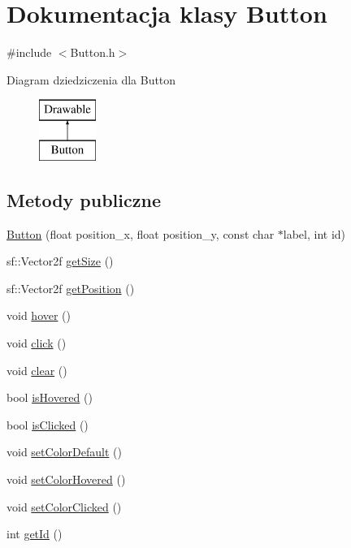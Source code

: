 \hypertarget{class_button}{}\section{Dokumentacja klasy Button}
\label{class_button}


{\ttfamily \#include $<$Button.\+h$>$}

Diagram dziedziczenia dla Button\begin{figure}[H]
\begin{center}
\leavevmode
\includegraphics[height=2.000000cm]{class_button}
\end{center}
\end{figure}
\subsection*{Metody publiczne}
\begin{DoxyCompactItemize}
\item 
\mbox{\hyperlink{class_button_aeb4926acd6beafa022e3152b7ecbb992}{Button}} (float position\+\_\+x, float position\+\_\+y, const char $\ast$label, int id)
\item 
sf\+::\+Vector2f \mbox{\hyperlink{class_button_a0860c867e652f08390c05929d6837c13}{get\+Size}} ()
\item 
sf\+::\+Vector2f \mbox{\hyperlink{class_button_aa5acd27eed9dc39a80051436b30ebd41}{get\+Position}} ()
\item 
void \mbox{\hyperlink{class_button_a1a5ca19ed8efe0ea27625217dcab9f2c}{hover}} ()
\item 
void \mbox{\hyperlink{class_button_a2fc33ec22217562b28ac6f02bda26c6e}{click}} ()
\item 
void \mbox{\hyperlink{class_button_a31dfd83213a96fce828037745fc7e18f}{clear}} ()
\item 
bool \mbox{\hyperlink{class_button_a70c28ee3bec38814f77e6606e2da19ef}{is\+Hovered}} ()
\item 
bool \mbox{\hyperlink{class_button_acd766bf2e64e1aa93ad4c8a16b343347}{is\+Clicked}} ()
\item 
void \mbox{\hyperlink{class_button_a1a41668f07d7c7b03f05ab6602aa83e7}{set\+Color\+Default}} ()
\item 
void \mbox{\hyperlink{class_button_a0f71bfa269ec47509592cb2e4bed9a90}{set\+Color\+Hovered}} ()
\item 
void \mbox{\hyperlink{class_button_acbc078483f6c6a6c75b7ff00cf07dd05}{set\+Color\+Clicked}} ()
\item 
int \mbox{\hyperlink{class_button_a0b024eb643308f2cfa8d13cd93c6b1ca}{get\+Id}} ()
\end{DoxyCompactItemize}
